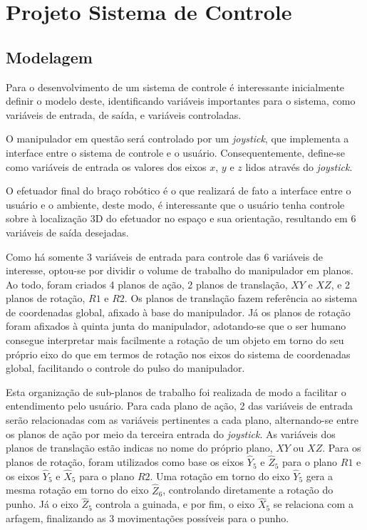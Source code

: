 \chapter{Projeto Sistema de Controle}


\label{CapProjCont}


\section{Modelagem}
Para o desenvolvimento de um sistema de controle é interessante inicialmente
definir o modelo deste, identificando variáveis importantes para o sistema,
como variáveis de entrada, de saída, e variáveis controladas.

O manipulador em questão será controlado por um \textit{joystick}, 
que implementa a interface entre o sistema de controle e o usuário. 
Consequentemente, define-se como variáveis de entrada os valores 
dos eixos $x$, $y$ e $z$ lidos através do \textit{joystick}.

O efetuador final do braço robótico é o que realizará de fato a
interface entre o usuário e o ambiente, deste modo, é interessante
que o usuário tenha controle sobre à localização 3D do efetuador
no espaço e sua orientação, resultando em 6 variáveis de saída desejadas.

Como há somente 3 variáveis de entrada para controle das 6 variáveis de 
interesse, optou-se por dividir o volume de trabalho do manipulador em 
planos. Ao todo, foram criados 4 planos de ação, 2 planos de translação, 
$XY$ e $XZ$, e 2 planos de rotação, $R1$ e $R2$. Os planos de translação
fazem referência ao sistema de coordenadas global, afixado à base do 
manipulador. Já os planos de rotação foram afixados à quinta junta do manipulador, 
adotando-se que o ser humano consegue interpretar mais facilmente a rotação 
de um objeto em torno do seu próprio eixo do que em termos de rotação nos 
eixos do sistema de coordenadas global, facilitando o controle do pulso do manipulador. 

Esta organização de sub-planos de trabalho foi realizada de modo a facilitar 
o entendimento pelo usuário. Para cada plano de ação, 2 das variáveis de entrada 
serão relacionadas com as variáveis pertinentes a cada plano, alternando-se entre 
os planos de ação por meio da terceira entrada do \textit{joystick}. As variáveis dos
planos de translação estão indicas no nome do próprio plano, $XY$ ou $XZ$. Para os planos
de rotação, foram utilizados como base os eixos $\hat{Y}_5$ e $\hat{Z}_5$ para o plano
$R1$ e os eixos $\hat{Y}_5$ e $\hat{X}_5$ para o plano $R2$. Uma rotação em torno do eixo 
$\hat{Y}_5$ gera a mesma rotação em torno do eixo $\hat{Z}_6$, controlando diretamente 
a rotação do punho. Já o eixo $\hat{Z}_5$ controla a guinada, e por fim, o eixo $\hat{X}_5$
se relaciona com a arfagem, finalizando as 3 movimentações possíveis para o punho.

